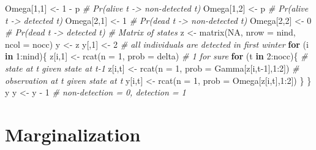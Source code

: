 \documentclass[
  12pt,
]{krantz}
\newenvironment{Shaded}{\begin{snugshade}}{\end{snugshade}}
\newcommand{\AttributeTok}[1]{\textcolor[rgb]{0.77,0.63,0.00}{#1}}
\newcommand{\CommentTok}[1]{\textcolor[rgb]{0.56,0.35,0.01}{\textit{#1}}}
\newcommand{\ConstantTok}[1]{\textcolor[rgb]{0.00,0.00,0.00}{#1}}
\newcommand{\ControlFlowTok}[1]{\textcolor[rgb]{0.13,0.29,0.53}{\textbf{#1}}}
\newcommand{\DecValTok}[1]{\textcolor[rgb]{0.00,0.00,0.81}{#1}}
\newcommand{\FunctionTok}[1]{\textcolor[rgb]{0.00,0.00,0.00}{#1}}
\newcommand{\NormalTok}[1]{#1}
\newcommand{\OtherTok}[1]{\textcolor[rgb]{0.56,0.35,0.01}{#1}}
\newcommand{\SpecialCharTok}[1]{\textcolor[rgb]{0.00,0.00,0.00}{#1}}
\begin{document}
\begin{Shaded}
\begin{Highlighting}[]
\NormalTok{Omega[}\DecValTok{1}\NormalTok{,}\DecValTok{1}\NormalTok{] }\OtherTok{\textless{}{-}} \DecValTok{1} \SpecialCharTok{{-}}\NormalTok{ p      }\CommentTok{\# Pr(alive t {-}\textgreater{} non{-}detected t)}
\NormalTok{Omega[}\DecValTok{1}\NormalTok{,}\DecValTok{2}\NormalTok{] }\OtherTok{\textless{}{-}}\NormalTok{ p          }\CommentTok{\# Pr(alive t {-}\textgreater{} detected t)}
\NormalTok{Omega[}\DecValTok{2}\NormalTok{,}\DecValTok{1}\NormalTok{] }\OtherTok{\textless{}{-}} \DecValTok{1}          \CommentTok{\# Pr(dead t {-}\textgreater{} non{-}detected t)}
\NormalTok{Omega[}\DecValTok{2}\NormalTok{,}\DecValTok{2}\NormalTok{] }\OtherTok{\textless{}{-}} \DecValTok{0}          \CommentTok{\# Pr(dead t {-}\textgreater{} detected t)}
\CommentTok{\# Matrix of states}
\NormalTok{z }\OtherTok{\textless{}{-}} \FunctionTok{matrix}\NormalTok{(}\ConstantTok{NA}\NormalTok{, }\AttributeTok{nrow =}\NormalTok{ nind, }\AttributeTok{ncol =}\NormalTok{ nocc)}
\NormalTok{y }\OtherTok{\textless{}{-}}\NormalTok{ z}
\NormalTok{y[,}\DecValTok{1}\NormalTok{] }\OtherTok{\textless{}{-}} \DecValTok{2} \CommentTok{\# all individuals are detected in first winter}
\ControlFlowTok{for}\NormalTok{ (i }\ControlFlowTok{in} \DecValTok{1}\SpecialCharTok{:}\NormalTok{nind)\{}
\NormalTok{  z[i,}\DecValTok{1}\NormalTok{] }\OtherTok{\textless{}{-}} \FunctionTok{rcat}\NormalTok{(}\AttributeTok{n =} \DecValTok{1}\NormalTok{, }\AttributeTok{prob =}\NormalTok{ delta) }\CommentTok{\# 1 for sure}
  \ControlFlowTok{for}\NormalTok{ (t }\ControlFlowTok{in} \DecValTok{2}\SpecialCharTok{:}\NormalTok{nocc)\{}
    \CommentTok{\# state at t given state at t{-}1}
\NormalTok{    z[i,t] }\OtherTok{\textless{}{-}} \FunctionTok{rcat}\NormalTok{(}\AttributeTok{n =} \DecValTok{1}\NormalTok{, }\AttributeTok{prob =}\NormalTok{ Gamma[z[i,t}\DecValTok{{-}1}\NormalTok{],}\DecValTok{1}\SpecialCharTok{:}\DecValTok{2}\NormalTok{]) }
    \CommentTok{\# observation at t given state at t}
\NormalTok{    y[i,t] }\OtherTok{\textless{}{-}} \FunctionTok{rcat}\NormalTok{(}\AttributeTok{n =} \DecValTok{1}\NormalTok{, }\AttributeTok{prob =}\NormalTok{ Omega[z[i,t],}\DecValTok{1}\SpecialCharTok{:}\DecValTok{2}\NormalTok{]) }
\NormalTok{  \}}
\NormalTok{\}}
\NormalTok{y}
\NormalTok{y }\OtherTok{\textless{}{-}}\NormalTok{ y }\SpecialCharTok{{-}} \DecValTok{1} \CommentTok{\# non{-}detection = 0, detection = 1}
\end{Highlighting}
\end{Shaded}

\hypertarget{marginalization}{%
\section{Marginalization}\label{marginalization}}
\end{document}
